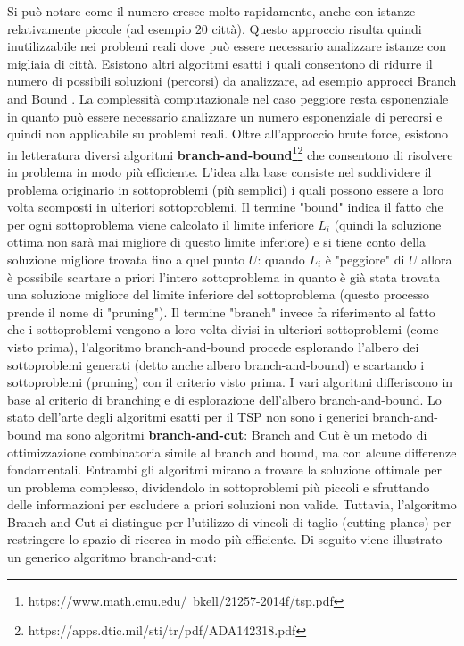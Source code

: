 \documentclass[a4paper,12pt]{report}
\begin{document}
Si può notare come il numero cresce molto rapidamente, anche con istanze relativamente piccole (ad esempio 20 città). Questo approccio risulta quindi inutilizzabile nei problemi reali dove può essere necessario analizzare istanze con migliaia di città.
\newline \null \newline Esistono altri algoritmi esatti i quali consentono di ridurre il numero di possibili soluzioni (percorsi) da analizzare, ad esempio approcci Branch and Bound \cite{Branch and Bound}. La complessità computazionale nel caso peggiore resta esponenziale in quanto può essere necessario analizzare un numero esponenziale di percorsi e quindi non applicabile su problemi reali.
\newline \null \newline 
Oltre all'approccio brute force, esistono in letteratura diversi algoritmi \textbf{branch-and-bound}\footnote[1]{https://www.math.cmu.edu/~bkell/21257-2014f/tsp.pdf}\footnote[2]{https://apps.dtic.mil/sti/tr/pdf/ADA142318.pdf} che consentono di risolvere in problema in modo più efficiente. L'idea alla base consiste nel suddividere il problema originario in sottoproblemi (più semplici) i quali possono essere a loro volta scomposti in ulteriori sottoproblemi. Il termine "bound" indica il fatto che per ogni sottoproblema viene calcolato il limite inferiore $L_i$ (quindi la soluzione ottima non sarà mai migliore di questo limite inferiore) e si tiene conto della soluzione migliore trovata fino a quel punto $U$: quando $L_i$ è "peggiore" di $U$ allora è possibile scartare a priori l'intero sottoproblema in quanto è già stata trovata una soluzione migliore del limite inferiore del sottoproblema (questo processo prende il nome di "pruning"). Il termine "branch" invece fa riferimento al fatto che i sottoproblemi vengono a loro volta divisi in ulteriori sottoproblemi (come visto prima), l'algoritmo branch-and-bound procede esplorando l'albero dei sottoproblemi generati (detto anche albero branch-and-bound) e scartando i sottoproblemi (pruning) con il criterio visto prima. I vari algoritmi differiscono in base al criterio di branching e di esplorazione dell'albero branch-and-bound. \newline \null \newline
Lo stato dell'arte degli algoritmi esatti per il TSP non sono i generici branch-and-bound ma sono algoritmi \textbf{branch-and-cut}\cite{Branch and Cut}: Branch and Cut è un metodo di ottimizzazione combinatoria simile al branch and bound, ma con alcune differenze fondamentali. Entrambi gli algoritmi mirano a trovare la soluzione ottimale per un problema complesso, dividendolo in sottoproblemi più piccoli e sfruttando delle informazioni per escludere a priori soluzioni non valide. Tuttavia, l'algoritmo Branch and Cut si distingue per l'utilizzo di vincoli di taglio (cutting planes) per restringere lo spazio di ricerca in modo più efficiente. Di seguito viene illustrato un generico algoritmo branch-and-cut:
\end{document}
